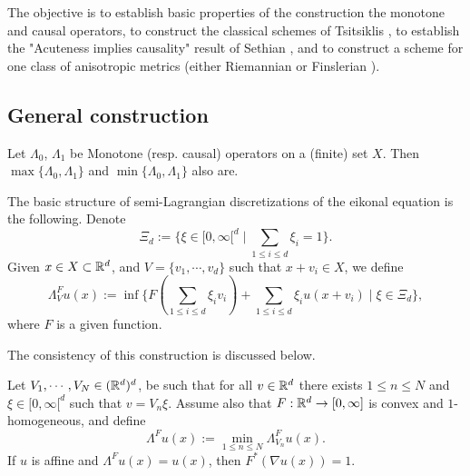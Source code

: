 The objective is to establish basic properties of the construction the monotone and causal operators, to construct the classical schemes of Tsitsiklis \cite{Tsitsiklis:1995EfficientTrajectories}, to establish the "Acuteness implies causality" result of Sethian \cite{Sethian2003OUM}, and to construct a scheme for one class of anisotropic metrics (either Riemannian \cite{Mirebeau:2014MarchingLattice} or Finslerian \cite{Mirebeau:2014EfficientFinsler}).

\subsection{General construction}



\begin{proposition}
Let $\Lambda_0$, $\Lambda_1$ be Monotone (resp. causal) operators on a (finite) set $X$. 
	Then $\max\{\Lambda_0,\Lambda_1\}$ and $\min\{\Lambda_0,\Lambda_1\}$ also are.
\end{proposition}


The basic structure of semi-Lagrangian discretizations of the eikonal equation \cite{Tsitsiklis:1995EfficientTrajectories,Sethian2003OUM,Bornemann:2006FiniteElement,Mirebeau:2014EfficientFinsler,Mirebeau:2014MarchingLattice} is the following.
Denote 
\begin{equation}
	\Xi_d := \{\xi \in [0,\infty[^d\mid\sum_{1 \leq i \leq d} \xi_i = 1\}. 
\end{equation}
Given $x\in X \subset \mathbb{R}^d$, and $V = \{v_1,\cdots,v_d\}$ such that $x+v_i \in X$, we define 
\begin{equation}
	\Lambda^F_V u(x) := \inf\{ F(\sum_{1 \leq i \leq d} \xi_i v_i) + \sum_{1 \leq i \leq d} \xi_i u(x+v_i) \mid \xi \in \Xi_d\},
\end{equation}
where $F$ is a given function.



The consistency of this construction is discussed below.

\begin{proposition}
	Let $V_1,\cdots,V_N \in (\mathbb{R}^d)^d$, be such that for all $v \in \mathbb{R}^d$ there exists $1 \leq n \leq N$ and $\xi \in [0,\infty[^d$ such that $v = V_n \xi$. 
Assume also that $F : \mathbb{R}^d \to [0,\infty]$ is convex and $1$-homogeneous, and define
\begin{equation}
	\Lambda^F u(x) := \min_{1 \leq n \leq N} \Lambda^F_{V_n} u(x). 
\end{equation}
If $u$ is affine and $\Lambda^F u(x) = u(x)$, then $F^*(\nabla u(x)) = 1$. 
\end{proposition}

